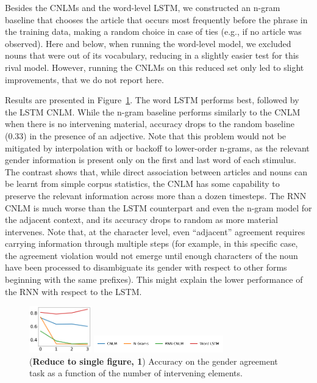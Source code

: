 Besides the CNLMs and the word-level LSTM, we constructed an n-gram baseline that chooses the article that occurs most frequently before the phrase in the training data, making a random choice in case of ties (e.g., if no article was observed). Here and below, when running the word-level model, we excluded nouns that were out of its vocabulary, reducing in a slightly easier test for this rival model. However, running the CNLMs on this reduced set only led to slight improvements, that we do not report here. 

Results are presented in Figure~\ref{fig:gender}. The word LSTM  performs best, followed by the LSTM CNLM.
While the n-gram baseline performs similarly to the CNLM when there is no intervening material, accuracy drops to the random baseline (0.33) in the presence of an adjective.
Note that this problem would not be mitigated by interpolation with or backoff to lower-order n-grams, as the relevant gender information is present only on the first and last word of each stimulus. The contrast shows that, while direct association between articles and nouns can be learnt from simple corpus statistics, the CNLM has some capability to preserve the relevant information across more than a dozen timesteps. The RNN CNLM is much worse than the LSTM counterpart and even the n-gram model for the adjacent context, and its accuracy drops to random as more material intervenes. Note that, at the character level, even ``adjacent'' agreement requires carrying information through multiple steps (for example, in this specific case, the agreement violation would not emerge until enough characters of the noun have been processed to disambiguate its gender with respect to other forms beginning with the same prefixes). This might explain the lower performance of the RNN with respect to the LSTM.


\begin{figure}
\includegraphics[width=0.24\textwidth]{figures/german-gender-total.pdf}

\centering\includegraphics[width=0.5\textwidth]{figures/german-legend.pdf}
\caption{(\textbf{Reduce to single figure, 1}) Accuracy on the gender agreement task as a function of the number of intervening elements.}\label{fig:gender}
\end{figure}


